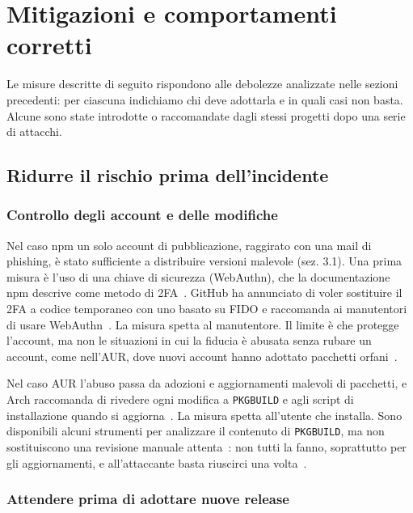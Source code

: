 \section{Mitigazioni e comportamenti corretti}
\label{sec:mitigazioni}

Le misure descritte di seguito rispondono alle debolezze analizzate nelle sezioni precedenti: per ciascuna indichiamo chi deve adottarla e in quali casi non basta. Alcune sono state introdotte o raccomandate dagli stessi progetti dopo una serie di attacchi.

\subsection{Ridurre il rischio prima dell'incidente}
\label{sec:ridurre-rischio-prima}

\subsubsection{Controllo degli account e delle modifiche}
\label{sec:controllo-account}

Nel caso npm un solo account di pubblicazione, raggirato con una mail di phishing, è stato sufficiente a distribuire versioni malevole (sez. 3.1). Una prima misura è l'uso di una chiave di sicurezza (WebAuthn), che la documentazione npm descrive come metodo di 2FA~\cite{npm-2fa-docs-2026}. GitHub ha annunciato di voler sostituire il 2FA a codice temporaneo con uno basato su FIDO e raccomanda ai manutentori di usare WebAuthn~\cite{github-plan-2025}. La misura spetta al manutentore. Il limite è che protegge l'account, ma non le situazioni in cui la fiducia è abusata senza rubare un account, come nell'AUR, dove nuovi account hanno adottato pacchetti orfani~\cite{lwn-aur-2026}.

Nel caso AUR l'abuso passa da adozioni e aggiornamenti malevoli di pacchetti, e Arch raccomanda di rivedere ogni modifica a \texttt{PKGBUILD} e agli script di installazione quando si aggiorna~\cite{arch-aur-incident-2026}. La misura spetta all'utente che installa. Sono disponibili alcuni strumenti per analizzare il contenuto di \texttt{PKGBUILD}, ma non sostituiscono una revisione manuale attenta~\cite{archwiki-aur}: non tutti la fanno, soprattutto per gli aggiornamenti, e all'attaccante basta riuscirci una volta~\cite{lwn-aur-2026}.

\subsubsection{Attendere prima di adottare nuove release}
\label{sec:attendere-release}


